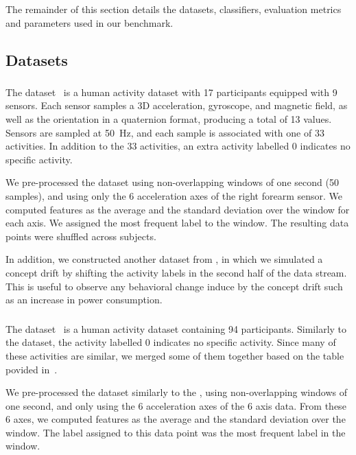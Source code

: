 The remainder of this section details the datasets, classifiers,
evaluation metrics and parameters used in our benchmark.

\subsection{Datasets}
\subsubsection{\banosdataset}
The \banosdataset dataset~\cite{Banos_2014} is a
human activity dataset with 17 participants
equipped with 9 sensors. Each sensor samples a 3D
acceleration, gyroscope, and magnetic field, as
well as the orientation in a quaternion format,
producing a total of 13 values.  Sensors are
sampled at 50~Hz, and each sample is associated
with one of 33 activities. In addition to the 33
activities, an extra activity labelled 0 indicates
no specific activity.

We pre-processed the \banosdataset dataset using
non-overlapping windows of one second (50
samples), and using only the 6 acceleration axes
of the right forearm sensor. We computed features
as the average and the standard deviation over the
window for each axis. We assigned the most
frequent label to the window.  The resulting data
points were shuffled across subjects.

In addition, we constructed another dataset from \banosdataset, in which we
simulated a concept drift by shifting the activity labels in the
second half of the data stream. This is useful to
observe any behavioral change induce by the
concept drift such as an increase in power
consumption.

\subsubsection{\recofitdataset}
The \recofitdataset dataset~\cite{recofit} is a
human activity dataset containing 94
participants. Similarly to the \banosdataset
dataset, the activity labelled 0 indicates no
specific activity.
Since many of these activities are similar, we
merged some of them together based on the table
povided in~\cite{behzad2019}. 

We pre-processed the dataset similarly to the
\banosdataset, using non-overlapping windows of
one second, and only using the 6 acceleration axes
of the 6 axis data. From these 6 axes, we computed
features as the average and the standard deviation
over the window. The label assigned to this data
point was the most frequent label in the window.

